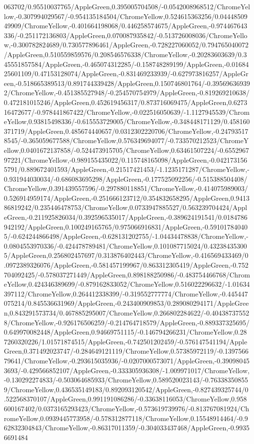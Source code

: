 {\begin{tikzternal}
063702/0.95510037765/AppleGreen,0.395005704508/-0.0542008968512/ChromeYellow,-0.307994029567/-0.954135184504/ChromeYellow,0.524615363256/0.0444850949909/ChromeYellow,-0.401664198068/0.446258574675/AppleGreen,-0.974467643336/-0.251172136803/AppleGreen,0.070087935842/-0.513726008036/ChromeYellow,-0.300782824689/0.730577896461/AppleGreen,-0.728227060052/0.794765040072/AppleGreen,0.510559859576/0.208546576338/ChromeYellow,-0.20283603639/0.345551857584/AppleGreen,-0.465074312285/-0.158748289199/AppleGreen,-0.0168425601109/0.47153128074/AppleGreen,-0.831469233939/-0.627973816257/AppleGreen,-0.518665389513/0.891744339428/AppleGreen,0.150746801764/-0.395696369392/ChromeYellow,-0.451385527948/-0.254570754979/AppleGreen,-0.819269210638/0.472181015246/AppleGreen,0.452619456317/0.873716069475/AppleGreen,0.627316472677/-0.978441867422/ChromeYellow,-0.022516050639/-1.1127945539/ChromeYellow,0.93815498336/-0.615553729005/ChromeYellow,-0.348448171129/0.458160371719/AppleGreen,0.485674440657/0.0312302220706/ChromeYellow,-0.247935178545/-0.365059677588/ChromeYellow,0.576349694077/-0.733570212523/ChromeYellow,0.0401672137858/-0.524473915705/ChromeYellow,0.63461507224/-0.655296797221/ChromeYellow,-0.989155435022/0.115748165098/AppleGreen,-0.0421731565791/0.889672401593/AppleGreen,-0.21517421453/-1.1235171287/ChromeYellow,-0.931944030034/-0.686083695298/AppleGreen,-0.177525092256/-0.515388504408/ChromeYellow,0.391439557596/-0.297880118851/ChromeYellow,-0.414075989003/0.526914959174/AppleGreen,-0.251666123712/0.354832658295/AppleGreen,0.941386819242/0.235446478753/ChromeYellow,0.0733947885527/0.563239704424/AppleGreen,-0.211925826034/0.392596535017/AppleGreen,-0.389624191541/0.0184786942192/AppleGreen,0.100249165765/0.975066916831/AppleGreen,-0.591017840405/-0.624244866498/AppleGreen,-0.628131202755/-1.04434478838/ChromeYellow,-0.0804553970336/-0.424478789481/ChromeYellow,0.101087715024/0.432384353005/AppleGreen,0.256802457697/0.313876402443/ChromeYellow,-0.416569433469/0.0972389326076/AppleGreen,-0.581457199967/0.863312305419/AppleGreen,-0.752704092425/-0.578037271449/AppleGreen,0.898188250986/-0.483754466768/ChromeYellow,0.424346389699/-0.879162833052/ChromeYellow,0.516022296632/-1.01634397112/ChromeYellow,0.264412338399/-0.319552777774/ChromeYellow,-0.445447075214/0.845536631969/AppleGreen,-0.243400909853/0.289080294171/AppleGreen,0.843291573734/0.467885295007/ChromeYellow,0.266802284622/-0.404387375528/ChromeYellow,-0.926176506259/-0.214764718579/AppleGreen,-0.889337325695/0.649970082448/AppleGreen,0.94669751115/-0.146794266231/ChromeYellow,0.287260320226/1.01571874515/AppleGreen,-0.742501202459/-0.576147541194/AppleGreen,0.371492023747/-0.284649121119/ChromeYellow,0.57385972119/-0.139756679641/ChromeYellow,-0.293615035936/-0.0207000573071/AppleGreen,-0.390980453693/-0.429566852107/AppleGreen,-0.333305936308/-1.009971017/ChromeYellow,-0.130292274833/-0.503064685933/ChromeYellow,0.589520023143/-0.763383508559/ChromeYellow,0.436535149183/0.892093120542/AppleGreen,-0.827439325744/0.522568370107/AppleGreen,0.991191086286/-0.33638116053/ChromeYellow,0.958600167402/0.0373165293423/ChromeYellow,-0.573619739976/-0.813767081924/ChromeYellow,0.0939445773958/-0.578312877118/ChromeYellow,0.15548914464/-0.962832304843/ChromeYellow,-0.86317011359/-0.304033437468/AppleGreen,-0.99356691484
\end{tikzternal}}
